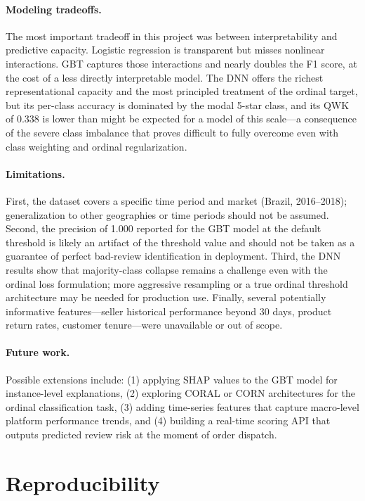 \documentclass[11pt]{article}
\begin{document}
\paragraph{Modeling tradeoffs.}
The most important tradeoff in this project was between interpretability and predictive capacity. Logistic regression is transparent but misses nonlinear interactions. GBT captures those interactions and nearly doubles the F1 score, at the cost of a less directly interpretable model. The DNN offers the richest representational capacity and the most principled treatment of the ordinal target, but its per-class accuracy is dominated by the modal 5-star class, and its QWK of 0.338 is lower than might be expected for a model of this scale---a consequence of the severe class imbalance that proves difficult to fully overcome even with class weighting and ordinal regularization.

\paragraph{Limitations.}
First, the dataset covers a specific time period and market (Brazil, 2016--2018); generalization to other geographies or time periods should not be assumed. Second, the precision of 1.000 reported for the GBT model at the default threshold is likely an artifact of the threshold value and should not be taken as a guarantee of perfect bad-review identification in deployment. Third, the DNN results show that majority-class collapse remains a challenge even with the ordinal loss formulation; more aggressive resampling or a true ordinal threshold architecture may be needed for production use. Finally, several potentially informative features---seller historical performance beyond 30 days, product return rates, customer tenure---were unavailable or out of scope.

\paragraph{Future work.}
Possible extensions include: (1) applying SHAP values to the GBT model for instance-level explanations, (2) exploring CORAL or CORN architectures for the ordinal classification task, (3) adding time-series features that capture macro-level platform performance trends, and (4) building a real-time scoring API that outputs predicted review risk at the moment of order dispatch.

\section{Reproducibility}
\end{document}
